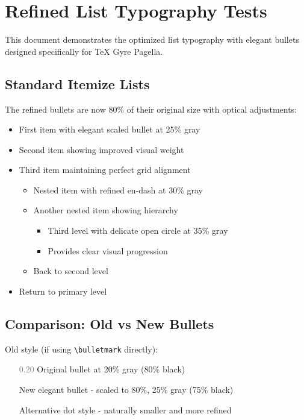 \documentclass[11pt,a4paper]{article}
\begin{document}
\showgrid

\section{Refined List Typography Tests}

This document demonstrates the optimized list typography with elegant bullets designed specifically for TeX Gyre Pagella.

\subsection{Standard Itemize Lists}

The refined bullets are now 80\% of their original size with optical adjustments:
\begin{itemize}
\item First item with elegant scaled bullet at 25\% gray
\item Second item showing improved visual weight
\item Third item maintaining perfect grid alignment
  \begin{itemize}
  \item Nested item with refined en-dash at 30\% gray
  \item Another nested item showing hierarchy
    \begin{itemize}
    \item Third level with delicate open circle at 35\% gray
    \item Provides clear visual progression
    \end{itemize}
  \item Back to second level
  \end{itemize}
\item Return to primary level
\end{itemize}

\subsection{Comparison: Old vs New Bullets}

Old style (if using \texttt{\textbackslash bulletmark} directly):
\begin{itemize}
\item[\textcolor{gray}{0.20}{\textbullet}] Original bullet at 20\% gray (80\% black)
\item[\elegantbullet] New elegant bullet - scaled to 80\%, 25\% gray (75\% black)
\item[\elegantdot] Alternative dot style - naturally smaller and more refined
\end{itemize}
\end{document}
